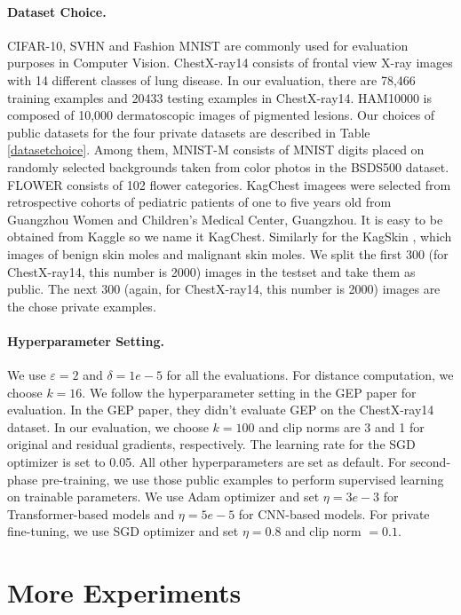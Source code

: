 \documentclass[11pt]{article}
\renewcommand{\epsilon}{\varepsilon}
\begin{document}
\paragraph{Dataset Choice.} CIFAR-10, SVHN and Fashion MNIST are commonly used for evaluation purposes in Computer Vision. ChestX-ray14 consists of frontal view X-ray images with 14 different classes of lung disease. In our evaluation, there are 78,466 training examples and 20433 testing examples in ChestX-ray14. HAM10000 is composed of 10,000 dermatoscopic images of pigmented lesions. Our choices of public datasets for the four private datasets are described in Table \ref{datasetchoice}. Among them, MNIST-M \cite{mnistm} consists of MNIST digits placed on randomly selected backgrounds taken from color photos in the BSDS500 dataset. FLOWER \cite{flower} consists of 102 flower categories. KagChest \cite{kagchest} imagees were selected from retrospective cohorts of pediatric patients of one to five years old from Guangzhou Women and Children’s Medical Center, Guangzhou. It is easy to be obtained from Kaggle so we name it KagChest. Similarly for the KagSkin \cite{kagskin}, which images of benign skin moles and malignant skin moles. We split the first 300 (for ChestX-ray14, this number is 2000) images in the testset and take them as public. The next 300 (again, for ChestX-ray14, this number is 2000) images are the chose private examples.


\paragraph{Hyperparameter Setting.} We use $\epsilon=2$ and $\delta=1e-5$ for all the evaluations. For distance computation, we choose $k=16$. We follow the hyperparameter setting in the GEP paper for evaluation. In the GEP paper, they didn't evaluate GEP on the ChestX-ray14 dataset. In our evaluation, we choose $k=100$ and clip norms are 3 and 1 for original and residual gradients, respectively. The learning rate for the SGD optimizer is set to 0.05. All other hyperparameters are set as default. For second-phase pre-training, we use those public examples to perform supervised learning on trainable parameters. We use Adam optimizer and set $\eta=3e-3$ for Transformer-based models and $\eta=5e-5$ for CNN-based models. For private fine-tuning, we use SGD optimizer and set $\eta=0.8$ and clip norm $=0.1$.

\section{More Experiments}
\label{appmoreexp}
\end{document}
